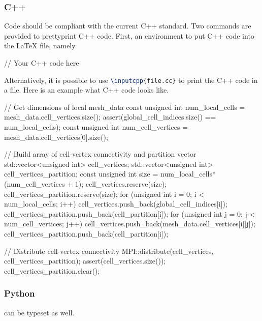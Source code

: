 \documentclass{ansarticle}
\begin{document}
\subsubsection{C++}

Code should be compliant with the current C++ standard. Two commands
are provided to prettyprint C++ code. First, an environment to put C++
code into the LaTeX file, namely


\begin{latexcode}
\begin{c++}
  // Your C++ code here
\end{c++}
\end{latexcode}

Alternatively, it is possible to use
\lstinline[language=TeX]!\inputcpp{file.cc}!  to print the C++ code in
a file. Here is an example what C++ code looks like.

\begin{c++}
// Get dimensions of local mesh_data
const unsigned int num_local_cells = mesh_data.cell_vertices.size();
assert(global_cell_indices.size() == num_local_cells);
const unsigned int num_cell_vertices = mesh_data.cell_vertices[0].size();

// Build array of cell-vertex connectivity and partition vector
std::vector<unsigned int> cell_vertices;
std::vector<unsigned int> cell_vertices_partition;
const unsigned int size = num_local_cells*(num_cell_vertices + 1);
cell_vertices.reserve(size);
cell_vertices_partition.reserve(size);
for (unsigned int i = 0; i < num_local_cells; i++)
{
  cell_vertices.push_back(global_cell_indices[i]);
  cell_vertices_partition.push_back(cell_partition[i]);
  for (unsigned int j = 0; j < num_cell_vertices; j++)
  {
    cell_vertices.push_back(mesh_data.cell_vertices[i][j]);
    cell_vertices_partition.push_back(cell_partition[i]);
  }
}

// Distribute cell-vertex connectivity
MPI::distribute(cell_vertices, cell_vertices_partition);
assert(cell_vertices.size());
cell_vertices_partition.clear();
\end{c++}

\subsubsection{Python}
can be typeset as well.
\end{document}
